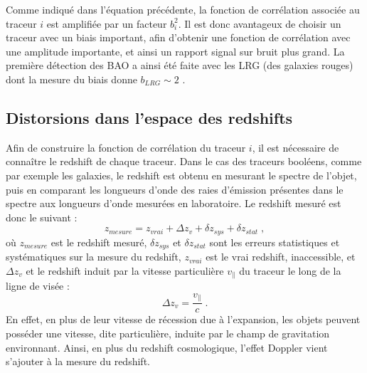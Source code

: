 Comme indiqué dans l'équation précédente, la fonction de corrélation associée au traceur $i$ est amplifiée par un facteur $b_{i}^2$.
Il est donc avantageux de choisir un traceur avec un biais important, afin d'obtenir une fonction de corrélation avec une amplitude importante, et ainsi un rapport signal sur bruit plus grand. La première détection des BAO a ainsi été faite avec les LRG (des galaxies rouges) dont la mesure du biais donne $b_{LRG} \sim 2$ \autocite{Eisenstein2005}.

\subsection{Distorsions dans l'espace des redshifts}
Afin de construire la fonction de corrélation du traceur $i$, il est nécessaire de connaître le redshift de chaque traceur. Dans le cas des traceurs booléens, comme par exemple les galaxies, le redshift est obtenu en mesurant le spectre de l'objet, puis en comparant les longueurs d'onde des raies d'émission présentes dans le spectre aux longueurs d'onde mesurées en laboratoire. Le redshift mesuré est donc le suivant :
\begin{equation}
  z_{mesure} = z_{vrai} + \Delta z_{v} + \delta z_{sys} + \delta z_{stat}  \; ,
\end{equation}
où $z_{mesure}$ est le redshift mesuré, $\delta z_{sys}$ et $\delta z_{stat}$ sont les erreurs statistiques et systématiques sur la mesure du redshift, $z_{vrai}$ est le vrai redshift, inaccessible,
et $\Delta z_{v}$ et le redshift induit par la vitesse particulière $v_{\parallel}$ du traceur le long de la ligne de visée :
\begin{equation}
  \label{eq:delta_z}
  \Delta z_{v} = \frac{v_{\parallel}}{c} \; .
\end{equation}
En effet, en plus de leur vitesse de récession due à l'expansion, les objets peuvent posséder une vitesse, dite particulière, induite par le champ de gravitation environnant. 
Ainsi, en plus du redshift cosmologique, l'effet Doppler vient s'ajouter à la mesure du redshift.
